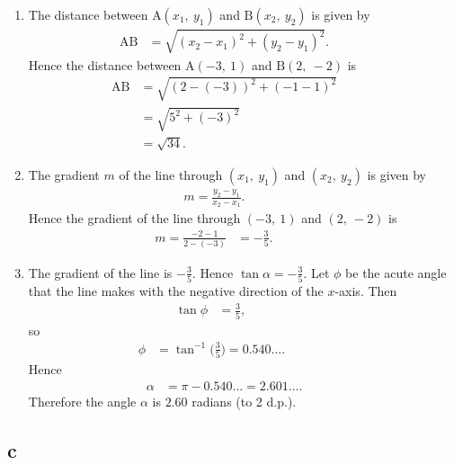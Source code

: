 \documentclass{article}
\begin{document}
\begin{enumerate}
	\item The distance between $\mathrm A(x_1,~y_1)$ and $\mathrm B(x_2,~y_2)$ is given by
	      \begin{align*}
		      \mathrm {AB} & = \sqrt{{(x_2-x_1)}^2 + {(y_2-y_1)}^2} \mathrm. &  &  &  &
	      \end{align*}
	      Hence the distance between $\mathrm A (-3,~1)$ and $\mathrm B (2,~-2)$ is
	      \begin{align*}
		      \mathrm {AB} & = \sqrt{{(2-(-3))}^2 + {(-1-1)}^2} &  &  &  & \\
		                   & = \sqrt {5^2 + (-3)^2}             &  &  &  & \\
		                   & = \sqrt {34}\mathrm .              &  &  &  &
	      \end{align*}

	\item The gradient $m$ of the line through $(x_1,~y_1)$ and $(x_2,~y_2)$ is given by
	      \begin{align*}
		      m = \frac {y_2 - y_1} {x_2 - x_1} \mathrm . &  &  &  &  &  &
	      \end{align*}
	      Hence the gradient of the line through $(-3,~1)$ and $(2,~-2)$ is
	      \begin{align*}
		      m = \frac {-2-1} {2-(-3)} & = -\frac 35\mathrm . &  &  &  & \;\;\;\;\;\;
	      \end{align*}

	\item The gradient of the line is $-\frac 35$. Hence $\tan \alpha = - \frac 35$.
	      Let $\phi$ be the acute angle that the line makes with the negative direction of the $x$-axis. Then
	      \begin{align*}
		      \tan \phi & = \frac 35 \mathrm , &  &  &  &  &  & \;\;
	      \end{align*}
	      so
	      \begin{align*}
		      \phi & = \tan^{-1} \Big( \frac 35 \Big) = 0.540\dots\mathrm . &  & \;\;\;\;\;\;\;\;\;\;\;\;\;
	      \end{align*}
	      Hence
	      \begin{align*}
		      \alpha & = \pi - 0.540\dots = 2.601 \dots \mathrm . &  &  &  &
	      \end{align*}
	      Therefore the angle $\alpha$ is $2.60$ radians (to 2 d.p.).
\end{enumerate}

\subsection{c}
\end{document}
